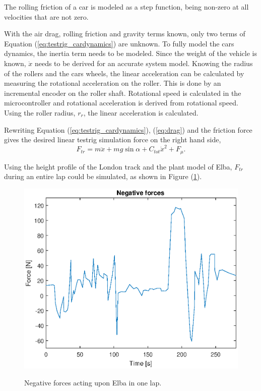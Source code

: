 The rolling friction of a car is modeled as a step function, being non-zero at
all velocities that are not zero.

With the air drag, rolling friction and gravity terms known, only two terms of
Equation (\ref{eq:testrig_cardynamics}) are unknown. To fully model the cars
dynamics, the inertia term needs to be modeled. Since the weight of the vehicle
is known, $\ddot{x}$ needs to be derived for an accurate system model.
Knowing the radius of the rollers and the cars wheels, the linear acceleration
can be calculated by measuring the rotational acceleration on the roller. This
is done by an incremental encoder on the roller shaft. Rotational speed is
calculated in the microcontroller and rotational acceleration is derived from
rotational speed. Using the roller radius, $r_{r}$, the linear acceleration
is calculated.

Rewriting Equation (\ref{eq:testrig_cardynamics}), (\ref{eq:drag}) and the friction force gives the
desired linear testrig simulation force on the right hand side,
\begin{equation} \label{eq:simulationforce}
    F_{tr} = m\ddot{x} + mg\sin{\alpha} + C_{tot}\dot{x}^2 + F_{\mu}.
\end{equation}

Using the height profile of the London track and the plant model of Elba, $F_{tr}$ during an entire lap could be simulated, as shown in Figure (\ref{fig:testrig_negative_forces}).

\begin{figure}[H]
    \centering\label{fig:testrig_negative_forces}
    \includegraphics[width=\textwidth]{./img/testrig_negative_forces.eps}
    \caption{Negative forces acting upon Elba in one lap.}
\end{figure}

